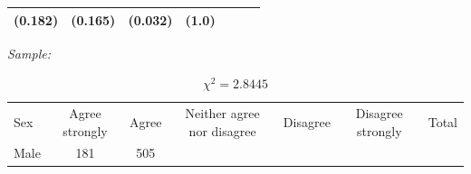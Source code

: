 \documentclass[11pt,a4paper,openany]{book}
\begin{document}
\begin{longtable}[]{@{}lcccccr@{}}
\begin{minipage}[t]{0.09\columnwidth}
(0.182)\strut
\end{minipage} & \begin{minipage}[t]{0.06\columnwidth}\centering\strut
(0.165)\strut
\end{minipage} & \begin{minipage}[t]{0.06\columnwidth}\centering\strut
(0.032)\strut
\end{minipage} & \begin{minipage}[t]{0.04\columnwidth}\raggedleft\strut
(1.0)\strut
\end{minipage}\tabularnewline
\bottomrule
\end{longtable}

\emph{Sample:}

\begin{longtable}[]{@{}lcccccr@{}}
\caption{\label{tab:t-sex-attitude-H0pop}
\(\chi^{2}=2.8445\)}\tabularnewline
\toprule
\begin{minipage}[t]{0.33\columnwidth}\raggedright\strut
Sex\strut
\end{minipage} & \begin{minipage}[t]{0.08\columnwidth}\centering\strut
Agree strongly\strut
\end{minipage} & \begin{minipage}[t]{0.07\columnwidth}\centering\strut
Agree\strut
\end{minipage} & \begin{minipage}[t]{0.11\columnwidth}\centering\strut
Neither agree nor disagree\strut
\end{minipage} & \begin{minipage}[t]{0.08\columnwidth}\centering\strut
Disagree\strut
\end{minipage} & \begin{minipage}[t]{0.08\columnwidth}\centering\strut
Disagree strongly\strut
\end{minipage} & \begin{minipage}[t]{0.05\columnwidth}\raggedleft\strut
Total\strut
\end{minipage}\tabularnewline
\begin{minipage}[t]{0.33\columnwidth}\raggedright\strut
Male\strut
\end{minipage} & \begin{minipage}[t]{0.08\columnwidth}\centering\strut
181\strut
\end{minipage} & \begin{minipage}[t]{0.07\columnwidth}\centering\strut
505\strut
\end{minipage} & \begin{minipage}[t]{0.11\columnwidth}\centering\strut

\end{minipage}
\end{longtable}
\end{document}
